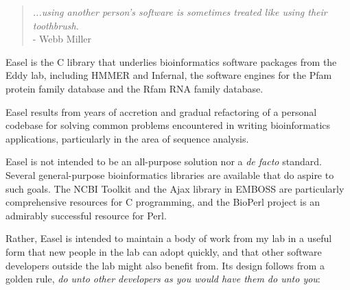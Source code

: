 

\begin{quote}
 \emph{...using another person's software is sometimes treated like 
 using their toothbrush.}\\
\hspace*{1em}\hfill - Webb Miller \citep{Miller01}
\end{quote}


Easel is the C library that underlies bioinformatics software packages
from the Eddy lab, including HMMER and Infernal, the
software engines for the Pfam protein family database and the
Rfam RNA family database.

Easel results from years of accretion and gradual refactoring of a
personal codebase for solving common problems encountered in writing
bioinformatics applications, particularly in the area of sequence
analysis.

Easel is not intended to be an all-purpose solution nor a \emph{de
facto} standard. Several general-purpose bioinformatics libraries are
available that do aspire to such goals. The NCBI Toolkit and the Ajax
library in EMBOSS are particularly comprehensive resources for C
programming, and the BioPerl project is an admirably successful
resource for Perl.

Rather, Easel is intended to maintain a body of work from my lab in a
useful form that new people in the lab can adopt quickly, and that
other software developers outside the lab might also benefit from. Its
design follows from a golden rule, \emph{do unto other developers as
you would have them do unto you}:

